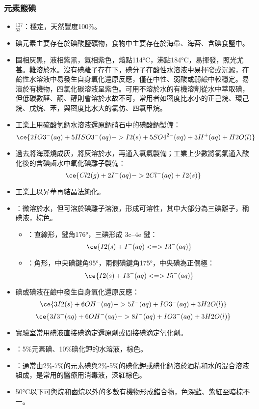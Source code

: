 \documentclass[a4paper,12pt]{report}
\begin{document}
\subsubsection{元素態碘}
\begin{itemize}
\item $^{127}_{53}$\rmI：穩定，天然豐度100\%。
\item 碘元素主要存在於碘酸鹽礦物，食物中主要存在於海帶、海苔、含碘食鹽中。
\item 固相灰黑，液相紫黑，氣相紫色，熔點114°C，沸點184°C，易揮發，照光尤甚。難溶於水。沒有碘離子存在下，碘分子在酸性水溶液中易揮發或沉澱，在鹼性水溶液中易發生自身氧化還原反應，僅在中性、弱酸或弱鹼中較穩定。易溶於有機物，四氯化碳溶液呈紫色。可用不溶於水的有機溶劑從水中萃取碘，但低碳數醛、酮、醇則會溶於水故不可，常用者如密度比水小的正己烷、環己烷、戊烷、苯，與密度比水大的氯仿、四氯甲烷。
\item 工業上用硫酸氫鈉水溶液還原鈉硝石中的碘酸鈉製備：
\[\ce{2IO3^-(aq) + 5HSO3^-(aq) -> I2(s) + 5SO4^{2-}(aq) + 3H^+(aq) + H2O(l)}\]
\item 過去將海藻燒成灰，將灰溶於水，再通入氯氣製備；工業上少數將氯氣通入酸化後的含碘鹵水中氧化碘離子製備：
\[\ce{Cl2(g) + 2I^-(aq) -> 2Cl^-(aq) + I2(s)}\]
\item 工業上以昇華再結晶法純化。
\item {}：微溶於水，但可溶於碘離子溶液，形成可溶性，其中大部分為三碘離子，稱碘液，棕色。
\begin{itemize}
\item {}：直線形，鍵角176°，三碘形成 3c–4e 鍵：
\[\ce{I2(s) + I^-(aq) <=> I3^-(aq)}\]
\item {}：角形，中央碘鍵角95°，兩側碘鍵角175°，中央碘為正偶極：
\[\ce{I2(s) + I3^-(aq) <=> I5^-(aq)}\]
\end{itemize}
\item 碘或碘液在鹼中發生自身氧化還原反應：
\[\ce{3I2(s) + 6OH^-(aq) -> 5I^-(aq) + IO3^-(aq) + 3H2O(l)}\]
\[\ce{3I3^-(aq) + 6OH^-(aq) -> 8I^-(aq) + IO3^-(aq) + 3H2O(l)}\]
\item 實驗室常用碘液直接碘滴定還原劑或間接碘滴定氧化劑。
\item {}：5\%元素碘、10\%碘化鉀的水溶液，棕色。
\item {}：通常由2\%-7\%的元素碘與2\%-5\%的碘化鉀或碘化鈉溶於酒精和水的混合溶液組成，是常用的醫療用消毒液，深紅棕色。
\item 50°C以下可與烷和鹵烷以外的多數有機物形成錯合物，色深藍、紫紅至暗棕不一。
\end{itemize}
\end{document}
